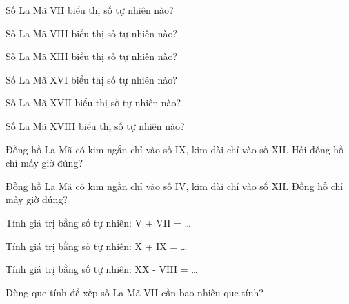 \begin{ex}
Số La Mã VII biểu thị số tự nhiên nào?
\end{ex}

\begin{ex}
Số La Mã VIII biểu thị số tự nhiên nào?
\end{ex}

\begin{ex}
Số La Mã XIII biểu thị số tự nhiên nào?
\end{ex}

\begin{ex}
Số La Mã XVI biểu thị số tự nhiên nào?
\end{ex}

\begin{ex}
Số La Mã XVII biểu thị số tự nhiên nào?
\end{ex}

\begin{ex}
Số La Mã XVIII biểu thị số tự nhiên nào?
\end{ex}

\begin{ex}
Đồng hồ La Mã có kim ngắn chỉ vào số IX, kim dài chỉ vào số XII. Hỏi đồng hồ chỉ mấy giờ đúng?
\end{ex}

\begin{ex}
Đồng hồ La Mã có kim ngắn chỉ vào số IV, kim dài chỉ vào số XII. Đồng hồ chỉ mấy giờ đúng?
\end{ex}

\begin{ex}
Tính giá trị bằng số tự nhiên: V + VII = \dots
{}
\end{ex}

\begin{ex}
Tính giá trị bằng số tự nhiên: X + IX = \dots
{}
\end{ex}

\begin{ex}
Tính giá trị bằng số tự nhiên: XX - VIII = \dots
{}
\end{ex}

\begin{ex}
Dùng que tính để xếp số La Mã VII cần bao nhiêu que tính?
\end{ex}
